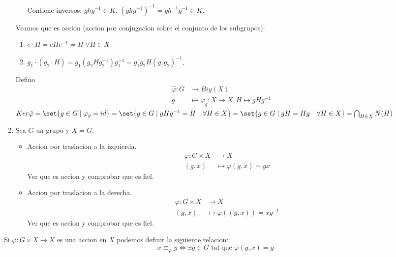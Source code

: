 \begin{example}
\begin{enumerate}
\begin{itemize}
			            Contiene inversos: \(gh g^{-1} \in K \), \((ghg^{-1} )^{-1} = g h^{-1} g^{-1} \in K \).
		      \end{itemize}
		      Veamos que es accion (accion por conjugacion sobre el conjunto de los subgrupos):
		      \begin{enumerate}
			      \item \(e \cdot H  = eH e^{-1} = H \; \forall H \in X\)
			      \item \(g_1 \cdot (g_2 \cdot H) = g_1 (g_2 H g^{-1}_2) g^{-1}_1 = g_1 g_2 H (g_1 g_2)^{-1} \).
		      \end{enumerate}
		      Defino
		      \[
			      \begin{aligned}
				      \hat{\varphi} \colon G & \longrightarrow Biy(X )                                      \\
				      g                      & \longmapsto \varphi_{g} \colon X \to X, H \mapsto g H g^{-1}
			      \end{aligned}
		      \]
		      \(Ker \hat{\varphi} = \set{g \in G \mid \varphi_g = id} = \set{g \in G \mid g H g^{-1} = H \quad \forall H \in X} = \set{g \in G \mid gH = Hg \quad \forall H \in X } = \bigcap_{H \in X} N(H)\)
		\item Sea \(G \) un grupo y \(X = G \).
		      \begin{itemize}
			      \item Accion por traslacion a la izquierda.  \[
				            \begin{aligned}
					            \varphi\colon G \times X & \longrightarrow  X             \\
					            (g,x)                    & \longmapsto \varphi(g,x) = gx
				            \end{aligned}
			            \]
			            Ver que es accion y comprobar que es fiel.
			      \item Accion por traslacion a la derecha. \[
				            \begin{aligned}
					            \varphi\colon G \times X & \longrightarrow X                      \\
					            (g,x )                   & \longmapsto \varphi((g,x )) = x g^{-1}
				            \end{aligned}
			            \]
			            Ver que es accion y comprobar que es fiel.
		      \end{itemize}
	\end{enumerate}
\end{example}
\begin{definition}
	Si \(\varphi\colon G \times X \to X \) es una accion en \(X \) podemos definir la siguiente relacion:
	\[
		x \equiv_\varphi y \iff \exists g \in G \text{ tal que } \varphi(g,x) = y
	\]
\end{definition}
